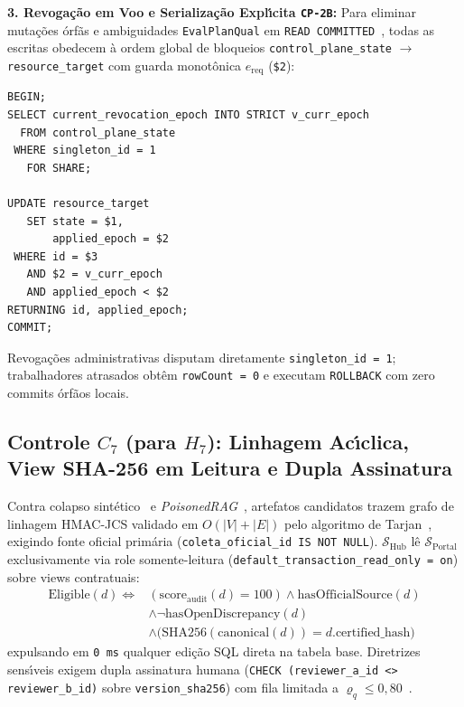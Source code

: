 \documentclass[10pt,twocolumn]{article}
\begin{document}
\textbf{3. Revoga\c{c}\~{a}o em Voo e Serializa\c{c}\~{a}o Expl\'{\i}cita \texttt{CP-2B}:} Para eliminar muta\c{c}\~{o}es \'{o}rf\~{a}s e ambiguidades \texttt{EvalPlanQual} em \texttt{READ COMMITTED}~\cite{R03,R13}, todas as escritas obedecem \`{a} ordem global de bloqueios \texttt{control\_plane\_state} $\to$ \texttt{resource\_target} com guarda monot\^{o}nica $e_{\mathrm{req}}$ (\texttt{\$2}):
\begin{lstlisting}
BEGIN;
SELECT current_revocation_epoch INTO STRICT v_curr_epoch
  FROM control_plane_state
 WHERE singleton_id = 1
   FOR SHARE;

UPDATE resource_target
   SET state = $1,
       applied_epoch = $2
 WHERE id = $3
   AND $2 = v_curr_epoch
   AND applied_epoch < $2
RETURNING id, applied_epoch;
COMMIT;
\end{lstlisting}
Revoga\c{c}\~{o}es administrativas disputam diretamente \texttt{singleton\_id = 1}; trabalhadores atrasados obt\^{e}m \texttt{rowCount = 0} e executam \texttt{ROLLBACK} com zero commits \'{o}rf\~{a}os locais.

\subsection{Controle $C_7$ (para $H_7$): Linhagem Ac\'{\i}clica, View SHA-256 em Leitura e Dupla Assinatura}

Contra colapso sint\'{e}tico~\cite{R23} e \emph{PoisonedRAG}~\cite{R26}, artefatos candidatos trazem grafo de linhagem HMAC-JCS validado em $O(|V| + |E|)$ pelo algoritmo de Tarjan~\cite{R02}, exigindo fonte oficial prim\'{a}ria (\texttt{coleta\_oficial\_id IS NOT NULL}). $\mathcal{S}_{\mathrm{Hub}}$ l\^{e} $\mathcal{S}_{\mathrm{Portal}}$ exclusivamente via role somente-leitura (\texttt{default\_transaction\_read\_only = on}) sobre views contratuais:
\begin{equation}
\begin{aligned}
\mathrm{Eligible}(d) \iff{} & (\mathrm{score}_{\mathrm{audit}}(d) = 100) \land \mathrm{hasOfficialSource}(d)\\
&\land \neg\mathrm{hasOpenDiscrepancy}(d)\\
&\land \bigl(\mathrm{SHA256}(\mathrm{canonical}(d)) = d.\mathrm{certified\_hash}\bigr)
\end{aligned}
\end{equation}
expulsando em \texttt{0 ms} qualquer edi\c{c}\~{a}o SQL direta na tabela base. Diretrizes sens\'{\i}veis exigem dupla assinatura humana (\texttt{CHECK (reviewer\_a\_id <> reviewer\_b\_id)} sobre \texttt{version\_sha256}) com fila limitada a $\varrho_q \le 0,80$~\cite{R08}.
\end{document}

